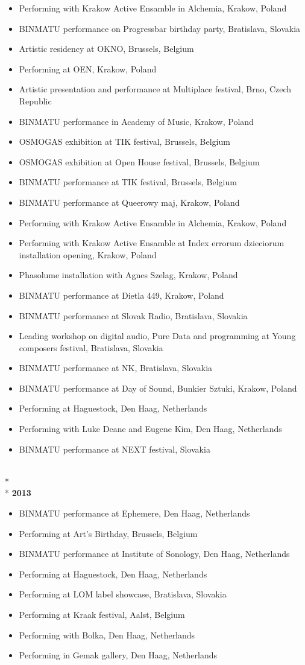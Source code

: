 \begin{itemize}
\item Performing with Krakow Active Ensamble in Alchemia, Krakow, Poland
\item BINMATU performance on Progressbar birthday party, Bratislava, Slovakia
\item Artistic residency at OKNO, Brussels, Belgium
\item Performing at OEN, Krakow, Poland
\item Artistic presentation and performance at Multiplace festival, Brno, Czech Republic
\item BINMATU performance in Academy of Music, Krakow, Poland
\item OSMOGAS exhibition at TIK festival, Brussels, Belgium
\item OSMOGAS exhibition at Open House festival, Brussels, Belgium
\item BINMATU performance at TIK festival, Brussels, Belgium
\item BINMATU performance at Queerowy maj, Krakow, Poland
\item Performing with Krakow Active Ensamble in Alchemia, Krakow, Poland
\item Performing with Krakow Active Ensamble at Index errorum dzieciorum installation opening, Krakow, Poland
\item Phasolume installation with Agnes Szelag, Krakow, Poland
\item BINMATU performance at Dietla 449, Krakow, Poland
\item BINMATU performance at Slovak Radio, Bratislava, Slovakia
\item Leading workshop on digital audio, Pure Data and programming at Young composers festival, Bratislava, Slovakia
\item BINMATU performance at NK, Bratislava, Slovakia
\item BINMATU performance at Day of Sound, Bunkier Sztuki, Krakow, Poland
\item Performing at Haguestock, Den Haag, Netherlands
\item Performing with Luke Deane and Eugene Kim, Den Haag, Netherlands
\item BINMATU performance at NEXT festival, Slovakia
\end{itemize}
\\*
\\*
\textbf{2013}
\begin{itemize}
\item BINMATU performance at Ephemere, Den Haag, Netherlands
\item Performing at Art's Birthday, Brussels, Belgium
\item BINMATU performance at Institute of Sonology, Den Haag, Netherlands
\item Performing at Haguestock, Den Haag, Netherlands
\item Performing at LOM label showcase, Bratislava, Slovakia
\item Performing at Kraak festival, Aalst, Belgium
\item Performing with Bolka, Den Haag, Netherlands
\item Performing in Gemak gallery, Den Haag, Netherlands
\end{itemize}
